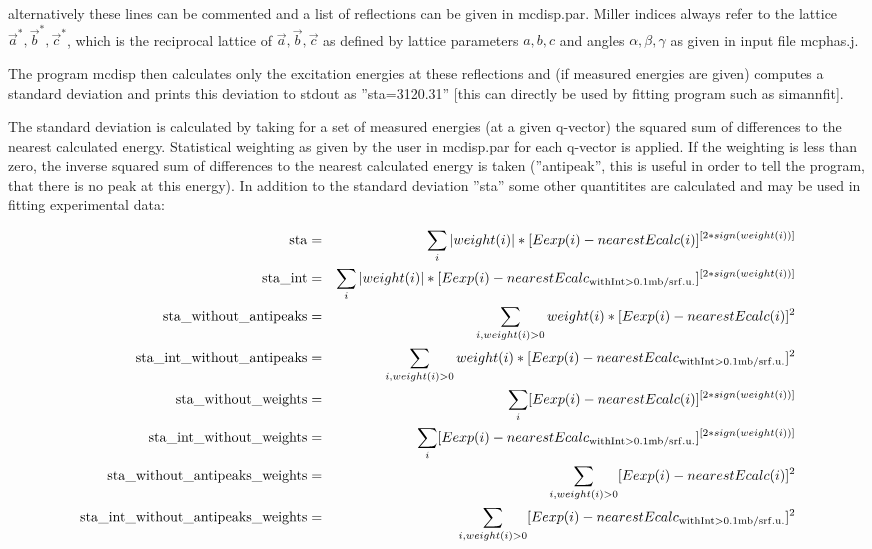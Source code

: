 alternatively these lines can be commented and a
list of reflections can be given in {\prg mcdisp.par}.
Miller indices always refer to the lattice $\vec a^*, \vec b^*, \vec c^*$, which
is the reciprocal lattice of $\vec a, \vec b, \vec c$ as defined by lattice
parameters $a,b,c$ and angles $\alpha,\beta,\gamma$ as given in
input file {\prg mcphas.j}.


The
program {\prg mcdisp} then calculates only 
the excitation energies at these reflections and (if measured
energies are given) computes a standard deviation
and prints
this deviation to stdout as ''sta=3120.31'' [this can directly
be used by fitting program such as {\prg simannfit}].

The standard deviation is calculated by taking for a set of measured energies (at a 
given q-vector) the squared sum of differences to the nearest
calculated energy. Statistical weighting as given by the user in {\prg mcdisp.par}
for each q-vector is applied. If the weighting is less than zero, the 
inverse squared sum of differences to the nearest
calculated energy is taken (''antipeak'', this is useful in order to 
tell the program, that there is no peak at this energy).
In addition to the standard deviation ''sta'' some other quantitites are calculated and 
may be used in fitting experimental data:

\begin{eqnarray}
{\rm sta}                              & =& \sum_i |weight(i)|*[Eexp(i) - nearestEcalc(i)]^{[2*sign(weight(i))]}\\
{\rm sta\_int   }                       & = &\sum_i |weight(i)|*[Eexp(i) - nearestEcalc_{\rm with %
Int>0.1mb/srf.u.}]^{[2*sign(weight(i))]}\\
{\rm sta\_without\_antipeaks }           & =& \sum_{i, weight(i)>0}  weight(i)*[Eexp(i) - nearestEcalc(i)]^2\\
{\rm sta\_int\_without\_antipeaks }       & =&\sum_{i,weight(i)>0}  weight(i)*[Eexp(i) - nearestEcalc_{\rm with %
Int>0.1mb/srf.u.}]^2\\
{\rm sta\_without\_weights }              &=& \sum_i [Eexp(i) - nearestEcalc(i)]^{[2*sign(weight(i))]}\\
{\rm sta\_int\_without\_weights}          & =&\sum_i [Eexp(i) - nearestEcalc_{\rm with %
Int>0.1mb/srf.u.}]^{[2*sign(weight(i))]}\\
{\rm sta\_without\_antipeaks\_weights}    & = &\sum_{i, weight(i)>0}[Eexp(i) - nearestEcalc(i)]^2\\
{\rm sta\_int\_without\_antipeaks\_weights}& =& \sum_{i, weight(i)>0} [Eexp(i) - nearestEcalc_{\rm with %
Int>0.1mb/srf.u.}]^2\\
\end{eqnarray}




